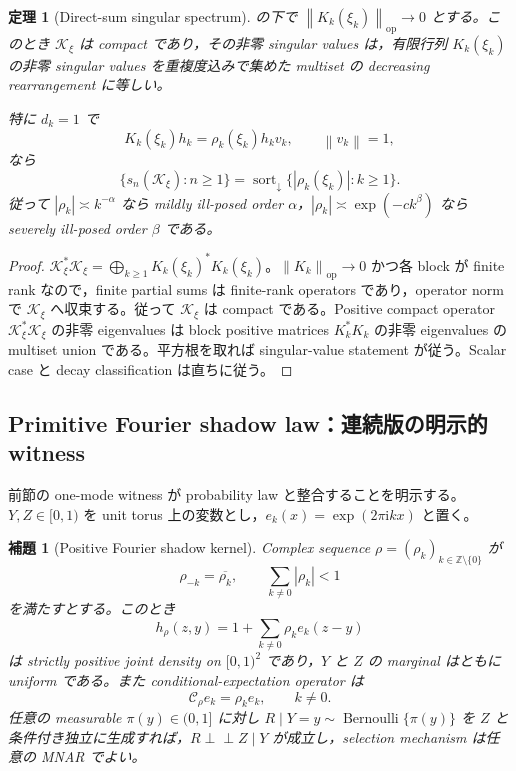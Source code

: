 \documentclass[11pt,a4paper]{ltjsarticle}
\newtheorem{theorem}{定理}[section]
\newtheorem{lemma}{補題}[section]
\theoremstyle{remark}
\newcommand{\ind}{\perp\!\!\!\perp}
\newcommand{\ii}{\mathrm i}
\newcommand{\abs}[1]{\left|#1\right|}
\newcommand{\norm}[1]{\left\lVert#1\right\rVert}
\newcommand{\Cop}{\mathscr C}
\newcommand{\Kop}{\mathscr K}
\newcommand{\op}{\operatorname{op}}
\begin{document}
\begin{theorem}[Direct-sum singular spectrum]\label{thm:directsumspectrum}
の下で $\norm{K_k(\xi_k)}_{\op}\to0$ とする。このとき $\Kop_\xi$ は compact であり，その非零 singular values は，有限行列 $K_k(\xi_k)$ の非零 singular values を重複度込みで集めた multiset の decreasing rearrangement に等しい。

特に $d_k=1$ で
\[
K_k(\xi_k)h_k=\rho_k(\xi_k)h_kv_k,
\qquad
\norm{v_k}=1,
\]
なら
\begin{equation}
\{s_n(\Kop_\xi):n\ge1\}
=\operatorname{sort}_{\downarrow}
\{\abs{\rho_k(\xi_k)}:k\ge1\}.
\label{eq:scalarsingulars}
\end{equation}
従って $\abs{\rho_k}\asymp k^{-\alpha}$ なら mildly ill-posed order $\alpha$，$\abs{\rho_k}\asymp\exp(-ck^\beta)$ なら severely ill-posed order $\beta$ である。
\end{theorem}

\begin{proof}
$\Kop_\xi^*\Kop_\xi=\bigoplus_{k\ge1}K_k(\xi_k)^*K_k(\xi_k)$。$\norm{K_k}_{\op}\to0$ かつ各 block が finite rank なので，finite partial sums は finite-rank operators であり，operator norm で $\Kop_\xi$ へ収束する。従って $\Kop_\xi$ は compact である。Positive compact operator $\Kop_\xi^*\Kop_\xi$ の非零 eigenvalues は block positive matrices $K_k^*K_k$ の非零 eigenvalues の multiset union である。平方根を取れば singular-value statement が従う。Scalar case と decay classification は直ちに従う。
\end{proof}

\subsection{Primitive Fourier shadow law：連続版の明示的 witness}

前節の one-mode witness が probability law と整合することを明示する。$Y,Z\in[0,1)$ を unit torus 上の変数とし，$e_k(x)=\exp(2\pi\ii kx)$ と置く。

\begin{lemma}[Positive Fourier shadow kernel]\label{lem:fouriershadowkernel}
Complex sequence $\rho=(\rho_k)_{k\in\mathbb Z\setminus\{0\}}$ が
\[
\rho_{-k}=\overline{\rho_k},
\qquad
\sum_{k\ne0}\abs{\rho_k}<1
\]
を満たすとする。このとき
\begin{equation}
h_\rho(z,y)
=1+\sum_{k\ne0}\rho_ke_k(z-y)
\label{eq:fourierkernel}
\end{equation}
は strictly positive joint density on $[0,1)^2$ であり，$Y$ と $Z$ の marginal はともに uniform である。また conditional-expectation operator は
\begin{equation}
\Cop_\rho e_k=\rho_ke_k,
\qquad k\ne0.
\label{eq:fouriermultiplier}
\end{equation}
任意の measurable $\pi(y)\in(0,1]$ に対し $R\mid Y=y\sim\operatorname{Bernoulli}\{\pi(y)\}$ を $Z$ と条件付き独立に生成すれば，$R\ind Z\mid Y$ が成立し，selection mechanism は任意の MNAR でよい。
\end{lemma}
\end{document}
